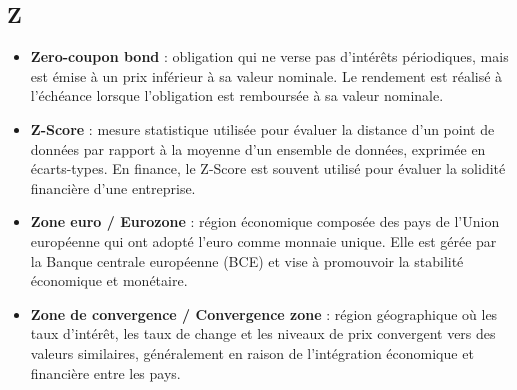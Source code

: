 \documentclass[a4paper,10pt]{article}
\begin{document}
\begin{multicols}{2}
\section*{Z}
\begin{itemize}
  \item \textbf{Zero-coupon bond} : obligation qui ne verse pas d’intérêts périodiques, mais est émise à un prix inférieur à sa valeur nominale. Le rendement est réalisé à l’échéance lorsque l’obligation est remboursée à sa valeur nominale.
  \item \textbf{Z-Score} : mesure statistique utilisée pour évaluer la distance d’un point de données par rapport à la moyenne d’un ensemble de données, exprimée en écarts-types. En finance, le Z-Score est souvent utilisé pour évaluer la solidité financière d’une entreprise.
  \item \textbf{Zone euro / Eurozone} : région économique composée des pays de l’Union européenne qui ont adopté l’euro comme monnaie unique. Elle est gérée par la Banque centrale européenne (BCE) et vise à promouvoir la stabilité économique et monétaire.
  \item \textbf{Zone de convergence / Convergence zone} : région géographique où les taux d’intérêt, les taux de change et les niveaux de prix convergent vers des valeurs similaires, généralement en raison de l’intégration économique et financière entre les pays.
\end{itemize}

\end{multicols}
\end{document}
